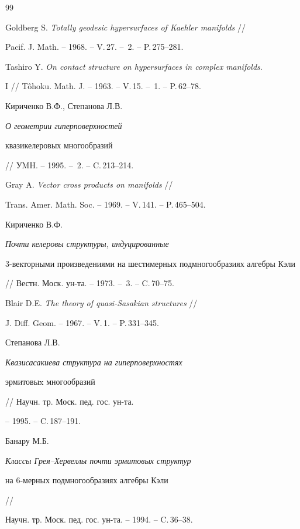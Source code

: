 \begin{thebibliography}{99}







Goldberg S. {\em Totally geodesic hypersurfaces of Kaehler manifolds} //


Pacif. J. Math. -- 1968. -- V.\,27. -- \No\,2. -- P.\,275--281.




Tashiro Y. {\em On contact structure on hypersurfaces in complex manifolds}.


I // T\^ohoku. Math. J. -- 1963. -- V.\,15. -- \No\,1. -- P.\,62--78.




Кириченко В.Ф., Степанова Л.В. {\em О геометрии гиперповерхностей 


квазикелеровых многообразий} // УMH. -- 1995. -- \No\,2. -- C.\,213--214.




Gray A. {\em Vector cross products on manifolds} //


Trans. Amer. Math. Soc. -- 1969. -- V.\,141. -- P.\,465--504.




Кириченко В.Ф. {\em Почти келеровы структуры, индуцированные 


$3$-векторными произведениями на шестимерных подмногообразиях алгебры Кэли}


// Вестн. Моск. ун-та. -- 1973. -- \No\,3. -- C.\,70--75.




Blair D.E. {\em The theory of quasi-Sasakian structures} //


J. Diff. Geom. -- 1967. -- V.\,1. -- P.\,331--345.




Степанова Л.В. {\em Квазисасакиева структура на гиперповерхностях


эрмитовыx многообразий} // Научн. тр. Моск. пед. гос. ун-та.


-- 1995. -- C.\,187--191.




Банару М.Б. {\em Классы Грея--Хервеллы почти эрмитовых структур 


на $6$-мерных подмногообразиях алгебры Кэли} // 


Научн. тр. Моск. пед. гос. ун-та. -- 1994. -- C.\,36--38.





\end{thebibliography}
